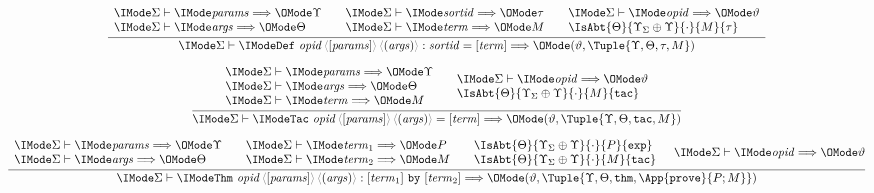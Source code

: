 \documentclass{article}
\begin{document}
\begin{gather}
  \infer{
    \Elab{\Sigma}{
      \DefDecl{\SortOpId}{\SortParams}{\SortArgs}{\SortSortId}{\SortTerm}
    }{(\vartheta,\Tuple{\Upsilon,\Theta,\tau,M})}
  }{
    \begin{array}{l}
      \Elab{\Sigma}{\SortParams}{\Upsilon}\\
      \Elab{\Sigma}{\SortArgs}{\Theta}\\
    \end{array} &
    \begin{array}{l}
      \Elab{\Sigma}{\SortSortId}{\tau}\\
      \Elab{\Sigma}{\SortTerm}{M}
    \end{array} &
    \begin{array}{l}
      \Elab{\Sigma}{\SortOpId}{\vartheta}\\
      \IsAbt{\Theta}{\Upsilon_\Sigma\oplus\Upsilon}{\cdot}{M}{\tau}
    \end{array}
  }\\[6pt]
  \infer{
    \Elab{\Sigma}{
      \TacDecl{\SortOpId}{\SortParams}{\SortArgs}{\SortTerm}
    }{(\vartheta,\Tuple{\Upsilon,\Theta,\AbtSortTac,M})}
  }{
    \begin{array}{l}
      \Elab{\Sigma}{\SortParams}{\Upsilon}\\
      \Elab{\Sigma}{\SortArgs}{\Theta}\\
      \Elab{\Sigma}{\SortTerm}{M}
    \end{array} &
    \begin{array}{l}
      \Elab{\Sigma}{\SortOpId}{\vartheta}\\
      \IsAbt{\Theta}{\Upsilon_\Sigma\oplus\Upsilon}{\cdot}{M}{\AbtSortTac}
    \end{array}
  }\\[6pt]
  \infer{
    \Elab{\Sigma}{
      \ThmDecl{\SortOpId}{\SortParams}{\SortArgs}{\SortTerm_1}{\SortTerm_2}
    }{(\vartheta,\Tuple{\Upsilon,\Theta,\AbtSortThm,\App{\OpProve}{P;M}})}
  }{
    \begin{array}{l}
      \Elab{\Sigma}{\SortParams}{\Upsilon}\\
      \Elab{\Sigma}{\SortArgs}{\Theta}
    \end{array} &
    \begin{array}{l}
      \Elab{\Sigma}{\SortTerm_1}{P}\\
      \Elab{\Sigma}{\SortTerm_2}{M}
    \end{array} &
    \begin{array}{l}
      \IsAbt{\Theta}{\Upsilon_\Sigma\oplus\Upsilon}{\cdot}{P}{\AbtSortExp}\\
      \IsAbt{\Theta}{\Upsilon_\Sigma\oplus\Upsilon}{\cdot}{M}{\AbtSortTac}
    \end{array} &
    \Elab{\Sigma}{\SortOpId}{\vartheta}
  }
\end{gather}
\end{document}

